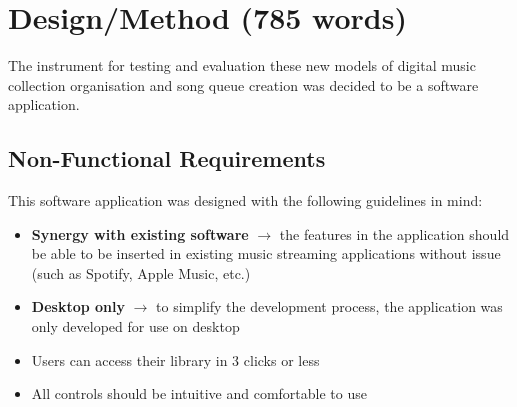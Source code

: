 \chapter{Design/Method (785 words)}

The instrument for testing and evaluation these new models of digital music collection organisation and song queue creation was decided to be a software application.

\section{Non-Functional Requirements}
This software application was designed with the following guidelines in mind:\begin{itemize}
    \item \textbf{
        Synergy with existing software
    } \(\to\) the features in the application should be able to be inserted in existing music streaming applications without issue (such as Spotify, Apple Music, etc.) %
    \item \textbf{
        Desktop only
    } \(\to\) to simplify the development process, the application was only developed for use on desktop
    \item Users can access their library in 3 clicks or less %
    \item All controls should be intuitive and comfortable to use
\end{itemize} %

